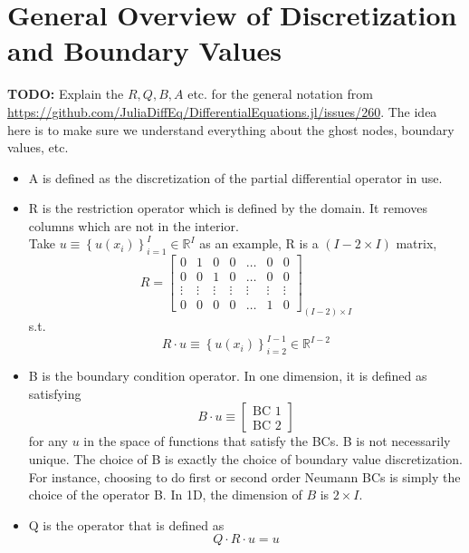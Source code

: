 \documentclass[11pt]{article}
\newcommand{\set}[1]{\ensuremath{\left\{{#1}\right\}}}
\newcommand{\R}{\ensuremath{\mathbb{R}}}
\begin{document}
\section{General Overview of Discretization and Boundary Values}\label{sec:general}
\textbf{TODO:} Explain the $R, Q, B, A$ etc. for the general notation from \url{https://github.com/JuliaDiffEq/DifferentialEquations.jl/issues/260}.  The idea here is to make sure we understand everything about the ghost nodes, boundary values, etc.
\begin{itemize}
\item A is defined as the discretization of the partial differential operator in use.
\item R is the restriction operator which is defined by the domain. It removes columns which are not in the interior.\\
Take $u \equiv \set{u(x_i)}_{i=1}^I \in \R^I$ as an example, R is a $(I-2\times I)$ matrix,
\begin{equation}
R = \begin{bmatrix}
0&1&0&0&\dots &0&0\\
0&0&1&0&\dots &0&0\\
\vdots&\vdots&\vdots&\vdots&\vdots&\vdots&\vdots\\
0&0&0&0&\dots&1&0
\end{bmatrix}_{(I-2)\times I}
\end{equation}
s.t.
\begin{equation}
R\cdot u  \equiv\set{u(x_i)}_{i=2}^{I-1} \in \R^{I-2} \label{R_operator}
\end{equation}
\item B is the boundary condition operator. In one dimension, it is defined as satisfying
\begin{equation}
B\cdot u \equiv \begin{bmatrix}
\text{BC 1}\\
\text{BC 2}
\end{bmatrix}\label{B_operator}
\end{equation}
for any $u$ in the space of functions that satisfy the BCs. B is not necessarily unique. The choice of B is exactly the choice of boundary value discretization. For instance, choosing to do first or second order Neumann BCs is simply the choice of the operator B. In 1D, the dimension of $B$ is $2\times I$.
\item Q is the operator that is defined as
\begin{equation}
Q \cdot R\cdot u = u\label{Q_operator_1}
\end{equation}

\end{itemize}
\end{document}
